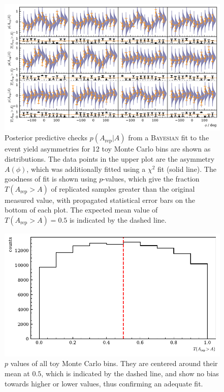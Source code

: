 	\begin{figure}
		\centering
		\includegraphics[width=\linewidth]{../bayes/toyMC/plots/toyMC_ppd_checks.pdf}
		\caption{Posterior predictive checks $p\left(A_\text{rep}\big|A\right)$ from a \textsc{Bayesian} fit to the event yield asymmetries for 12 toy Monte Carlo bins are shown as distributions. The data points in the upper plot are the asymmetry $A\left(\phi\right)$, which was additionally fitted using a $\chi^2$ fit (solid line). The goodness of fit is shown using $p$-values, which give the fraction $T\left(A_\text{rep}>A\right)$ of replicated samples greater than the original measured value, with propagated statistical error bars on the bottom of each plot. The expected mean value of $T\left(A_\text{rep}>A\right)=0.5$ is indicated by the dashed line. }
		\label{fig:toymc_asym}
	\end{figure}




\begin{figure}[htbp]
	\centering
	\includegraphics[width=\linewidth]{../bayes/toyMC/plots/toyMC_pval_hist.pdf}
	\caption{$p$ values of all toy Monte Carlo bins. They are centered around their mean at $0.5$, which is indicated by the dashed line, and show no bias towards higher or lower values, thus confirming an adequate fit.}
	\label{fig:toymc_pvals}
\end{figure}

